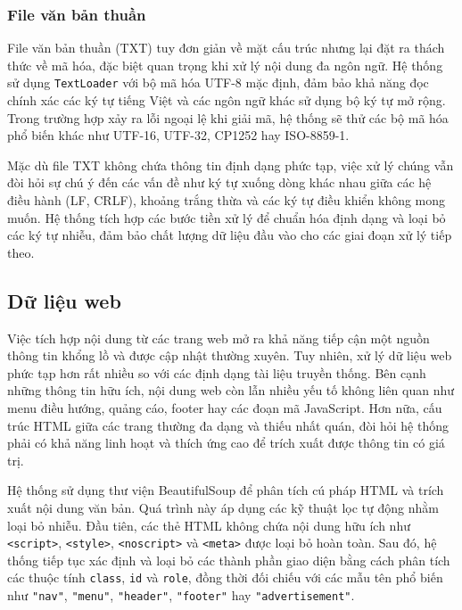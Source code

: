 \subsubsection{File văn bản thuần}

File văn bản thuần (TXT) tuy đơn giản về mặt cấu trúc nhưng lại đặt ra thách thức về mã hóa, đặc biệt quan trọng khi xử lý nội dung đa ngôn ngữ. Hệ thống sử dụng \texttt{TextLoader} với bộ mã hóa UTF-8 mặc định, đảm bảo khả năng đọc chính xác các ký tự tiếng Việt và các ngôn ngữ khác sử dụng bộ ký tự mở rộng. Trong trường hợp xảy ra lỗi ngoại lệ khi giải mã, hệ thống sẽ thử các bộ mã hóa phổ biến khác như UTF-16, UTF-32, CP1252 hay ISO-8859-1.

Mặc dù file TXT không chứa thông tin định dạng phức tạp, việc xử lý chúng vẫn đòi hỏi sự chú ý đến các vấn đề như ký tự xuống dòng khác nhau giữa các hệ điều hành (LF, CRLF), khoảng trắng thừa và các ký tự điều khiển không mong muốn. Hệ thống tích hợp các bước tiền xử lý để chuẩn hóa định dạng và loại bỏ các ký tự nhiễu, đảm bảo chất lượng dữ liệu đầu vào cho các giai đoạn xử lý tiếp theo.

\subsection{Dữ liệu web}

Việc tích hợp nội dung từ các trang web mở ra khả năng tiếp cận một nguồn thông tin khổng lồ và được cập nhật thường xuyên. Tuy nhiên, xử lý dữ liệu web phức tạp hơn rất nhiều so với các định dạng tài liệu truyền thống. Bên cạnh những thông tin hữu ích, nội dung web còn lẫn nhiều yếu tố không liên quan như menu điều hướng, quảng cáo, footer hay các đoạn mã JavaScript. Hơn nữa, cấu trúc HTML giữa các trang thường đa dạng và thiếu nhất quán, đòi hỏi hệ thống phải có khả năng linh hoạt và thích ứng cao để trích xuất được thông tin có giá trị.

Hệ thống sử dụng thư viện BeautifulSoup để phân tích cú pháp HTML và trích xuất nội dung văn bản. Quá trình này áp dụng các kỹ thuật lọc tự động nhằm loại bỏ nhiễu. Đầu tiên, các thẻ HTML không chứa nội dung hữu ích như \texttt{<script>}, \texttt{<style>}, \texttt{<noscript>} và \texttt{<meta>} được loại bỏ hoàn toàn. Sau đó, hệ thống tiếp tục xác định và loại bỏ các thành phần giao diện bằng cách phân tích các thuộc tính \texttt{class}, \texttt{id} và \texttt{role}, đồng thời đối chiếu với các mẫu tên phổ biến như \texttt{"nav"}, \texttt{"menu"}, \texttt{"header"}, \texttt{"footer"} hay \texttt{"advertisement"}.

